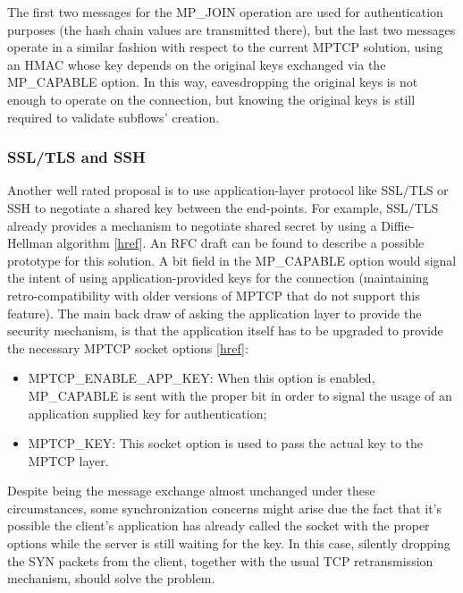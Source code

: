 The first two messages for the MP\_JOIN operation are used for authentication purposes (the hash chain values are transmitted there), but the last two messages operate in a similar fashion with respect to the current MPTCP solution, using an HMAC whose key depends on the original keys exchanged via the MP\_CAPABLE option. In this way, eavesdropping the original keys is not enough to operate on the connection, but knowing the original keys is still required to validate subflows' creation.

\subsubsection{SSL/TLS and SSH}
Another well rated proposal is to use application-layer protocol like SSL/TLS or SSH to negotiate a shared key between the end-points. For example, SSL/TLS already provides a mechanism to negotiate shared secret by using a Diffie-Hellman algorithm [\href{https://wiki.openssl.org/index.php/Diffie_Hellman#Diffie-Hellman_in_SSL.2FTLS}{href}].
  An RFC draft can be found to describe a possible prototype for this solution. A bit field in the MP\_CAPABLE option would signal the intent of using application-provided keys for the connection (maintaining retro-compatibility with older versions of MPTCP that do not support this feature).
The main back draw of asking the application layer to provide the security mechanism, is that the application itself has to be upgraded to provide the necessary MPTCP socket options [\href{http://tools.ietf.org/html/draft-paasch-mptcp-ssl-00}{href}]:

\begin{itemize}
  \item MPTCP\_ENABLE\_APP\_KEY: When this option is enabled, MP\_CAPABLE is sent with the proper bit in order to signal the usage of an application supplied key for authentication;
  \item MPTCP\_KEY: This socket option is used to pass the actual key to the MPTCP layer.
\end{itemize}

Despite being the message exchange almost unchanged under these circumstances, some synchronization concerns might arise due the fact that it's possible the client's application has already called the socket with the proper options while the server is still waiting for the key. In this case, silently dropping the SYN packets from the client, together with the usual TCP retransmission mechanism, should solve the problem.


